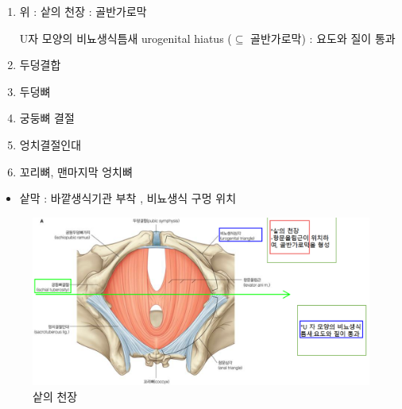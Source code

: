 \documentclass[10pt]{amsart}
\numberwithin{theorem}{section}
\numberwithin{example}{section}
\theoremstyle{definition}
\theoremstyle{remark}
\begin{document}
\begin{enumerate}
\item 위 : 샅의 천장  : 골반가로막 

U자 모양의 비뇨생식틈새 urogenital hiatus ($\subseteq$ 골반가로막) : 요도와 질이 통과 
    \item 두덩결합 
    \item 두덩뼈 
    \item 궁둥뼈 결절 
    \item 엉치결절인대 
    \item 꼬리뼈, 맨마지막 엉치뼈 
\end{enumerate}
\begin{itemize}
    \item 샅막 : 바깥생식기관 부착 , 비뇨생식 구멍 위치 
    
\end{itemize}

\begin{figure}[H]
    \centering
    \includegraphics[width=.7\textwidth]{pc1.png}
    \caption{샅의 천장}
    \label{fig:pc1}
\end{figure}
\end{document}
